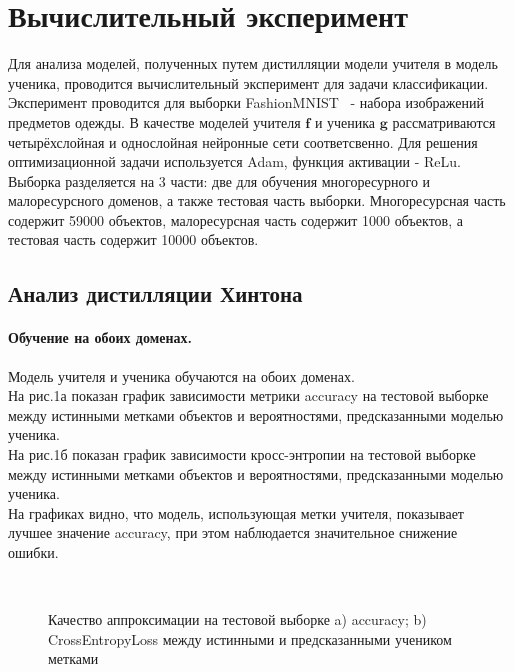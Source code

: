 \newpage

\section{Вычислительный эксперимент}

Для анализа моделей, полученных путем дистилляции модели учителя в модель ученика, проводится вычислительный эксперимент для задачи классификации.\\
Эксперимент проводится для выборки FashionMNIST~\cite{FMNIST} - набора изображений предметов одежды. В качестве моделей учителя $\textbf{f}$ и ученика $\textbf{g}$ рассматриваются четырёхслойная и однослойная нейронные сети соответсвенно. Для решения оптимизационной задачи используется Adam, функция активации - ReLu.\\
Выборка разделяется на 3 части: две для обучения многоресурного и малоресурсного доменов, а также тестовая часть выборки. Многоресурсная часть содержит 59000 объектов, малоресурсная часть содержит 1000 объектов, а тестовая часть содержит 10000 объектов.
\newpage
\subsection{Анализ дистилляции Хинтона}

\paragraph{Обучение на обоих доменах.}
Модель учителя и ученика обучаются на обоих доменах.\\
На рис.1а показан график зависимости метрики accuracy на тестовой выборке между истинными метками объектов и вероятностями, предсказанными моделью ученика.\\
На рис.1б показан график зависимости кросс-энтропии на тестовой выборке между истинными метками объектов и вероятностями, предсказанными моделью ученика.\\
На графиках видно, что модель, использующая метки учителя, показывает лучшее значение accuracy, при этом наблюдается значительное снижение ошибки.
\begin{figure}[h!t]\center
{}
\\
\caption{Качество аппроксимации на тестовой выборке a) accuracy; b) CrossEntropyLoss между истинными и предсказанными учеником метками}
\end{figure}

